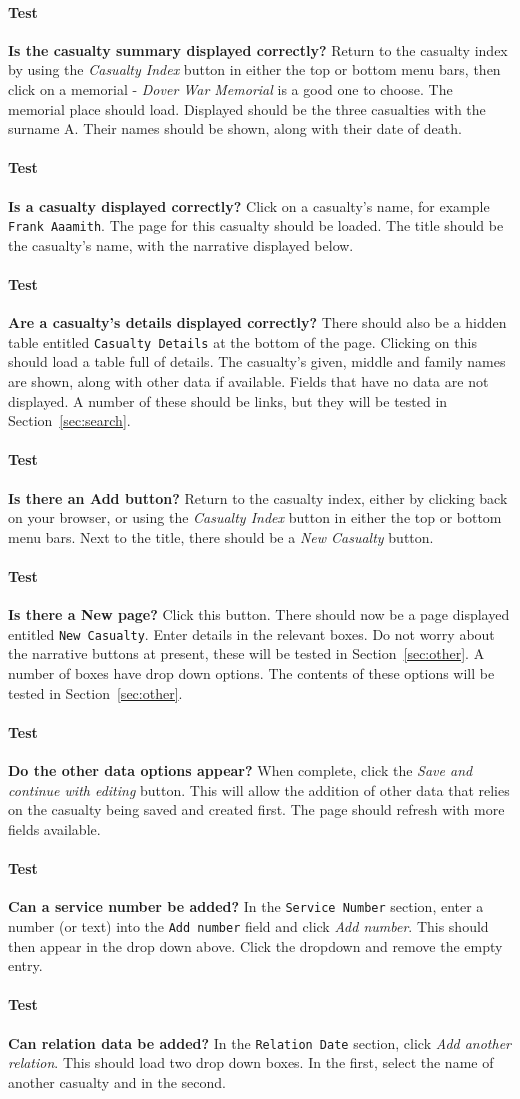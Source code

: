 \documentclass[12pt]{article}
\newcounter{Test}
\newcommand{\test}[1]{%
\stepcounter{Test}%
\paragraph{Test \theTest} \textbf{#1} }
\begin{document}
\test{Is the casualty summary displayed correctly?}
Return to the casualty index by using the \textit{Casualty Index} button in either the top or bottom menu bars, then click on a memorial - \textit{Dover War Memorial} is a good one to choose. The memorial place should load. Displayed should be the three casualties with the surname A. Their names should be shown, along with their date of death.

\test{Is a casualty displayed correctly?}
Click on a casualty's name, for example \texttt{Frank Aaamith}. The page for this casualty should be loaded. The title should be the casualty's name, with the narrative displayed below.

\test{Are a casualty's details displayed correctly?}
There should also be a hidden table entitled \texttt{Casualty Details} at the bottom of the page. Clicking on this should load a table full of details. The casualty's given, middle and family names are shown, along with other data if available. Fields that have no data are not displayed. A number of these should be links, but they will be tested in Section~\ref{sec:search}.

\test{Is there an Add button?}
Return to the casualty index, either by clicking back on your browser, or using the \textit{Casualty Index} button in either the top or bottom menu bars. Next to the title, there should be a \textit{New Casualty} button.

\test{Is there a New page?}
Click this button. There should now be a page displayed entitled \texttt{New Casualty}. Enter details in the relevant boxes. Do not worry about the narrative buttons at present, these will be tested in Section~\ref{sec:other}. A number of boxes have drop down options. The contents of these options will be tested in Section~\ref{sec:other}.

\test{Do the other data options appear?}
When complete, click the \textit{Save and continue with editing} button. This will allow the addition of other data that relies on the casualty being saved and created first. The page should refresh with more fields available.

\test{Can a service number be added?}
In the \texttt{Service Number} section, enter a number (or text) into the \texttt{Add number} field and click \textit{Add number}. This should then appear in the drop down above. Click the dropdown and remove the empty entry.

\test{Can relation data be added?}
In the \texttt{Relation Date} section, click \textit{Add another relation}. This should load two drop down boxes. In the first, select the name of another casualty and in the second.
\end{document}
